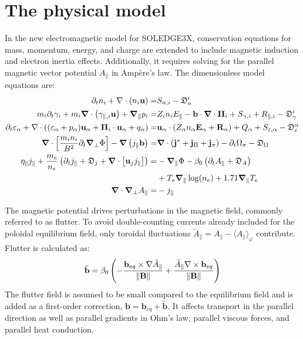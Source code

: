 \chapter{The physical model}
\label{chap:SOLEDGE3X_framework}

\vfill
\begin{chaptersummarybox}
	In the new electromagnetic model for SOLEDGE3X, conservation equations for mass, momentum, energy, and charge are extended to include magnetic induction and electron inertia effects. Additionally, it requires solving for the parallel magnetic vector potential $A_\parallel$ in Ampère's law. The dimensionless model equations are:
	\begin{align*}
		\partial_t n_i + \nabla\cdot\left(n_i\mathbf{u}\right) =& S_{n,i} - \mathfrak{D}_n^i \\
		m_i\partial_t \gamma_{i} + m_i\grad\cdot\left(\gamma_{\parallel,i}\mathbf{u}\right) + \grad_\parallel{p_i} =& Z_in_iE_\parallel - \mathbf{b}\cdot\grad\cdot\boldsymbol{\Pi}_i + S_{\gamma,i} + R_{\parallel,i} - \mathfrak{D}_\gamma^i \\
		\partial_t \varepsilon_\alpha + \nabla \cdot \left( (\varepsilon_\alpha + p_\alpha)\mathbf{u}_\alpha + \boldsymbol{\Pi}_i\cdot\mathbf{u}_\alpha + q_\alpha \right) =& \mathbf{u}_\alpha \cdot \left(Z_\alpha n_\alpha\mathbf{E}_\alpha + \mathbf{R}_\alpha \right) + Q_\alpha + S_{\varepsilon,\alpha} - \mathfrak{D}_\varepsilon^\alpha \\
		\grad\cdot\left[\frac{m_i n_i}{ B^2}\partial_t\grad_\perp\Phi\right] - \grad\left(j_\parallel \textbf{b}\right) =& \grad\cdot\left(\mathbf{j}^* + \mathbf{j}_{\Pi} + \mathbf{j}_{\pi}\right) - \partial_t \Omega_\pi  - \mathfrak{D}_\Omega \\
		\eta_\parallel j_\parallel + \frac{m_e}{n_e}\left(\partial_t j_\parallel + \mathfrak{D}_j + \grad\cdot\left[\textbf{u}_j j_\parallel \right]\right) =& -\grad_\parallel\Phi - \beta_0 \left(\partial_tA_\parallel + \mathfrak{D}_A\right) \\ 
		&+ T_e\grad_\parallel\log(n_e) + 1.71\grad_\parallel T_e \\
		\grad\cdot\grad_\perp A_\parallel =& -j_\parallel
	\end{align*}
	
	The magnetic potential drives perturbations in the magnetic field, commonly referred to as flutter. To avoid double-counting currents already included for the poloidal equilibrium field, only toroidal fluctuations $\tilde{A}_\parallel = A_\parallel - \langle A_\parallel\rangle_\varphi$ contribute. Flutter is calculated as:
	\begin{equation*}
		\tilde{\mathbf{b}} = \beta_0 \left(- \frac{\mathbf{b}_{eq} \times \nabla \tilde{A}_\parallel}{\norm{\mathbf{B}}} + \frac{\tilde{A}_\parallel \nabla \times \mathbf{b}_{eq}}{\norm{\mathbf{B}}}\right)
	\end{equation*}
	The flutter field is assumed to be small compared to the equilibrium field and is added as a first-order correction, $\textbf{b} = \textbf{b}_{eq} + \tilde{\textbf{b}}$. It affects transport in the parallel direction as well as parallel gradients in Ohm's law, parallel viscous forces, and parallel heat conduction.
\end{chaptersummarybox}
\vfill
\newpage


